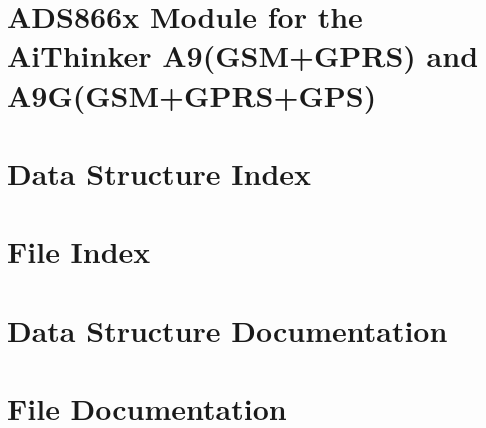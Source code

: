 \let\mypdfximage\pdfximage\def\pdfximage{\immediate\mypdfximage}\documentclass[twoside]{book}
\newcommand{\+}{\discretionary{\mbox{\scriptsize$\hookleftarrow$}}{}{}}
\newcommand{\clearemptydoublepage}{%
  \newpage{\pagestyle{empty}\cleardoublepage}%
}
\begin{document}
\chapter{ADS866x Module for the Ai\+Thinker A9(GSM+\+GPRS) and A9G(GSM+\+GPRS+\+GPS)}
\label{md_ads866x_lib__r_e_a_d_m_e}

\chapter{Data Structure Index}

\chapter{File Index}

\chapter{Data Structure Documentation}

\chapter{File Documentation}


























\backmatter
\newpage
{}
\clearemptydoublepage
{}
\printindex
\end{document}

